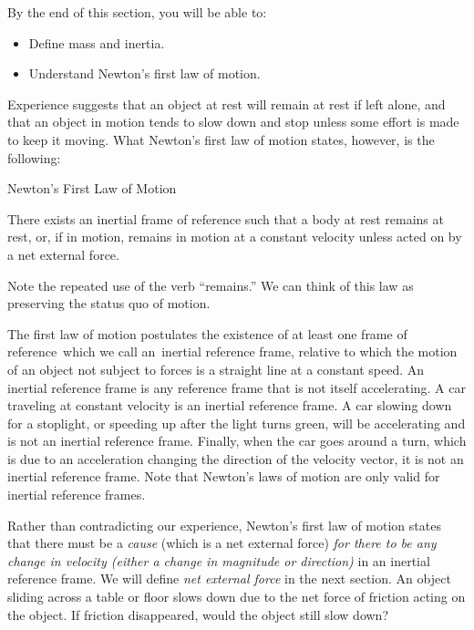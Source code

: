 \documentclass[
]{book}
\providecommand{\tightlist}{%
  \setlength{\itemsep}{0pt}\setlength{\parskip}{0pt}}
\begin{document}
By the end of this section, you will be able to:

\begin{itemize}
\tightlist
\item
  Define mass and inertia.
\item
  Understand Newton's first law of motion.
\end{itemize}

Experience suggests that an object at rest will remain at rest if left
alone, and that an object in motion tends to slow down and stop unless
some effort is made to keep it moving. What \protect\hypertarget{import-auto-id1777407}{}{Newton's first law of
motion}\textbf{} states, however, is
the following:

\hypertarget{fs-id2690663}{}
Newton's First Law of Motion

There exists an inertial frame of reference such that a body at rest
remains at rest, or, if in motion, remains in motion at a constant
velocity unless acted on by a net external force.

Note the repeated use of the verb ``remains.'' We can think of this law as
preserving the status quo of motion.

The first law of motion postulates the existence of at least one frame
of reference~which we call an~inertial reference frame, relative to
which the motion of an object not subject to forces is a straight line
at a constant speed. An inertial reference frame is any reference frame
that is not itself accelerating. A car traveling at constant velocity is
an inertial reference frame. A car slowing down for a stoplight, or
speeding up after the light turns green, will be accelerating and is not
an inertial reference frame. Finally, when the car goes around a turn,
which is due to an acceleration changing the direction of the velocity
vector, it is not an inertial reference frame. Note that Newton's laws
of motion are only valid for inertial reference frames.

Rather than contradicting our experience, {Newton's first law of
motion} states that there must be a \emph{cause} (which is
a net external force) \emph{for there to be any change in velocity (either a
change in magnitude or direction)} in an inertial reference frame. We
will define \emph{net external force} in the next section. An object sliding
across a table or floor slows down due to the net force of friction
acting on the object. If friction disappeared, would the object still
slow down?
\end{document}
